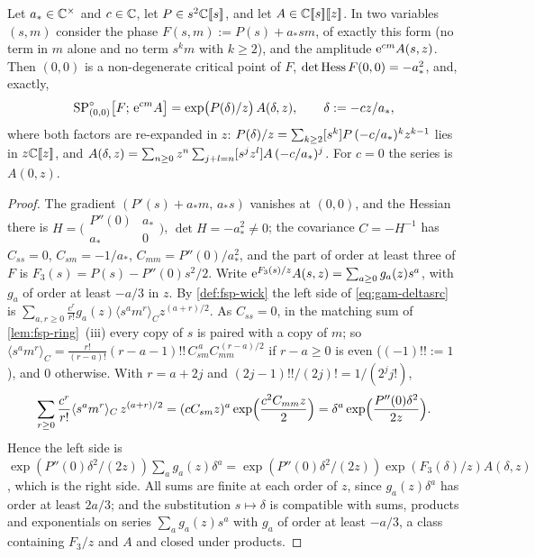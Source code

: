 \begin{lem}
\label{lem:gam-deltasrc}
Let $a_*\in\mathbb{C}^\times$ and $c\in\mathbb{C}$, let $P\in s^2\mathbb{C}[\![ s ]\!]$, and let $A\in\mathbb{C}[\![ s ]\!][\![ z ]\!]$. In two variables $(s,m)$ consider the phase $F(s,m):=P(s)+a_*sm$, of exactly this form (no term in $m$ alone and no term $s^km$ with $k\geq 2$), and the amplitude $\mathrm{e}^{cm}A(s,z)$. Then $(0,0)$ is a non-degenerate critical point of $F$, $\det\operatorname{Hess} F(0,0)=-a_*^2$, and, exactly,
\begin{equation}
\label{eq:gam-deltasrc}
\mathrm{SP}^{\circ}_{(0,0)}\bigl[F;\,\mathrm{e}^{cm}A\bigr]=\exp\bigl(P(\delta)/z\bigr)\,A(\delta,z),\qquad \delta:=-cz/a_*,
\end{equation}
where both factors are re-expanded in $z$: $P(\delta)/z=\sum_{k\geq 2}[s^k]P\,(-c/a_*)^kz^{k-1}$ lies in $z\mathbb{C}[\![ z ]\!]$, and $A(\delta,z)=\sum_{n\geq 0}z^n\sum_{j+l=n}[s^jz^l]A\,(-c/a_*)^j$. For $c=0$ the series is $A(0,z)$.
\end{lem}

\begin{proof}
The gradient $(P'(s)+a_*m,\,a_*s)$ vanishes at $(0,0)$, and the Hessian there is $H=\bigl(\begin{smallmatrix}P''(0)&a_*\\ a_*&0\end{smallmatrix}\bigr)$, $\det H=-a_*^2\neq0$; the covariance $C=-H^{-1}$ has $C_{ss}=0$, $C_{sm}=-1/a_*$, $C_{mm}=P''(0)/a_*^2$, and the part of order at least three of $F$ is $F_3(s)=P(s)-P''(0)s^2/2$. Write $\mathrm{e}^{F_3(s)/z}A(s,z)=\sum_{a\geq 0}g_a(z)s^a$, with $g_a$ of order at least $-a/3$ in $z$. By \cref{def:fsp-wick} the left side of \eqref{eq:gam-deltasrc} is $\sum_{a,r\geq 0}\frac{c^r}{r!}g_a(z)\langle s^am^r\rangle_Cz^{(a+r)/2}$. As $C_{ss}=0$, in the matching sum of \cref{lem:fsp-ring}~(iii) every copy of $s$ is paired with a copy of $m$; so $\langle s^am^r\rangle_C=\frac{r!}{(r-a)!}(r-a-1)!!\,C_{sm}^{\,a}C_{mm}^{\,(r-a)/2}$ if $r-a\geq0$ is even ($(-1)!!:=1$), and $0$ otherwise. With $r=a+2j$ and $(2j-1)!!/(2j)!=1/(2^jj!)$,
\[
\sum_{r\geq 0}\frac{c^r}{r!}\langle s^am^r\rangle_C\,z^{(a+r)/2}=(cC_{sm}z)^a\exp\Bigl(\frac{c^2C_{mm}z}{2}\Bigr)=\delta^a\exp\Bigl(\frac{P''(0)\delta^2}{2z}\Bigr).
\]
Hence the left side is $\exp(P''(0)\delta^2/(2z))\sum_ag_a(z)\delta^a=\exp(P''(0)\delta^2/(2z))\exp(F_3(\delta)/z)A(\delta,z)$, which is the right side. All sums are finite at each order of $z$, since $g_a(z)\delta^a$ has order at least $2a/3$; and the substitution $s\mapsto\delta$ is compatible with sums, products and exponentials on series $\sum_ag_a(z)s^a$ with $g_a$ of order at least $-a/3$, a class containing $F_3/z$ and $A$ and closed under products.
\end{proof}

